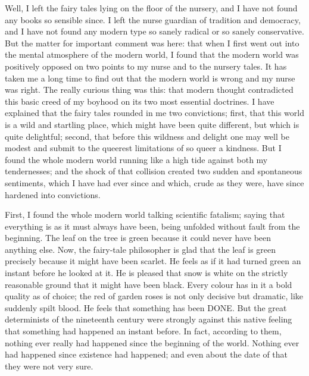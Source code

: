 Well, I left the fairy tales lying on the floor of the nursery, and I have not found any books so sensible since. I left the nurse guardian of tradition and democracy, and I have not found any modern type so sanely radical or so sanely conservative. But the matter for important comment was here: that when I first went out into the mental atmosphere of the modern world, I found that the modern world was positively opposed on two points to my nurse and to the nursery tales. It has taken me a long time to find out that the modern world is wrong and my nurse was right. The really curious thing was this: that modern thought contradicted this basic creed of my boyhood on its two most essential doctrines. I have explained that the fairy tales rounded in me two convictions; first, that this world is a wild and startling place, which might have been quite different, but which is quite delightful; second, that before this wildness and delight one may well be modest and submit to the queerest limitations of so queer a kindness. But I found the whole modern world running like a high tide against both my tendernesses; and the shock of that collision created two sudden and spontaneous sentiments, which I have had ever since and which, crude as they were, have since hardened into convictions.

First, I found the whole modern world talking scientific fatalism; saying that everything is as it must always have been, being unfolded without fault from the beginning. The leaf on the tree is green because it could never have been anything else. Now, the fairy-tale philosopher is glad that the leaf is green precisely because it might have been scarlet. He feels as if it had turned green an instant before he looked at it. He is pleased that snow is white on the strictly reasonable ground that it might have been black. Every colour has in it a bold quality as of choice; the red of garden roses is not only decisive but dramatic, like suddenly spilt blood. He feels that something has been DONE. But the great determinists of the nineteenth century were strongly against this native feeling that something had happened an instant before. In fact, according to them, nothing ever really had happened since the beginning of the world. Nothing ever had happened since existence had happened; and even about the date of that they were not very sure.

